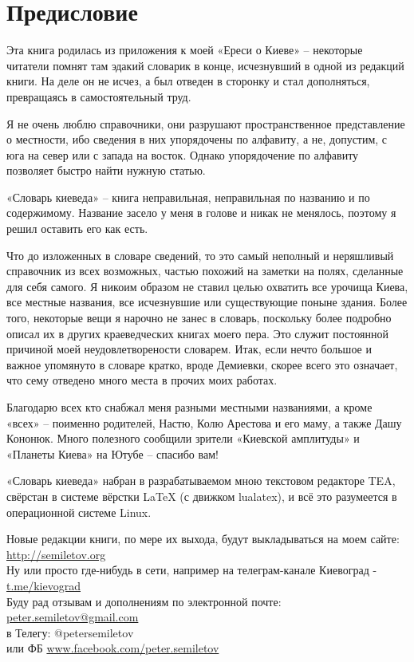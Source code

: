 \chapter*{Предисловие}

Эта книга родилась из приложения к моей «Ереси о Киеве» – некоторые читатели помнят там эдакий словарик в конце, исчезнувший в одной из редакций книги. На деле он не исчез, а был отведен в сторонку и стал дополняться, превращаясь в самостоятельный труд.

Я не очень люблю справочники, они разрушают пространственное представление о местности, ибо сведения в них упорядочены по алфавиту, а не, допустим, с юга на север или с запада на восток. Однако упорядочение по алфавиту позволяет быстро найти нужную статью.

«Словарь киеведа» – книга неправильная, неправильная по названию и по содержимому. Название засело у меня в голове и никак не менялось, поэтому я решил оставить его как есть. 

Что до изложенных в словаре сведений, то это самый неполный и неряшливый справочник из всех возможных, частью похожий на заметки на полях, сделанные для себя самого. Я никоим образом не ставил целью охватить все урочища Киева, все местные названия, все исчезнувшие или существующие поныне здания. Более того, некоторые вещи я нарочно не занес в словарь, поскольку более подробно описал их в других краеведческих книгах моего пера. Это служит постоянной причиной моей неудовлетворености словарем. Итак, если нечто большое и важное упомянуто в словаре кратко, вроде Демиевки, скорее всего это означает, что сему отведено много места в прочих моих работах.

Благодарю всех кто снабжал меня разными местными названиями, а кроме «всех» – поименно родителей, Настю, Колю Арестова и его маму, а также Дашу Кононюк. Много полезного сообщили зрители «Киевской амплитуды» и «Планеты Киева» на Ютубе – спасибо вам!

«Словарь киеведа» набран в разрабатываемом мною текстовом редакторе TEA, свёрстан в системе вёрстки LaTeX (с движком lualatex), и всё это разумеется в операционной системе Linux.

Новые редакции книги, по мере их выхода, будут выкладываться на моем сайте:\\ 
\href{http://semiletov.org}{http://semiletov.org}\\
Ну или просто где-нибудь в сети, например на телеграм-канале Киевоград - \href{t.me/kievograd}{t.me/kievograd}\\

Буду рад отзывам и дополнениям по электронной почте: \href{mailto:peter.semiletov@gmail.com}{peter.semiletov@gmail.com}\\
в Телегу: @petersemiletov\\
или ФБ \href{https://www.facebook.com/peter.semiletov}{www.facebook.com/peter.semiletov}
